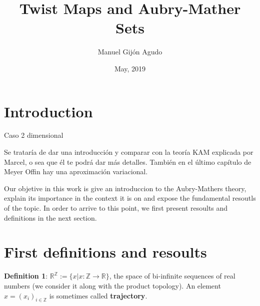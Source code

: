\documentclass{article}
\title{Twist Maps and Aubry-Mather Sets}
\author{Manuel Gijón Agudo }
\date{May, 2019}
\begin{document}
	\begin{titlepage}
		\maketitle{} 
	\end{titlepage}
	
	\newpage
	\tableofcontents
	\newpage
	

\section{Introduction}

	
	
	Caso 2 dimensional
	
	Se trataría de dar una introducción y comparar con la teoría KAM explicada por Marcel, o sea que él te podrá dar más detalles.
También en el último capítulo de Meyer Offin hay una aproximación variacional. 


		
	Our objetive in this work is give an introduccion to the Aubry-Mathers theory, explain its importance in the context it is on and expose the fundamental resoutls of the topic. In order to arrive to this point, we first present resoults and definitions in the next section.
		
		
		
	

	
		
	


\section{First definitions and resoults}
		
\noindent \textbf{Definition 1}: $\mathbb{R}^{\mathbb{Z}} := \{ x | x: \mathbb{Z} \rightarrow \mathbb{R}  \}$, the space of bi-infinite sequences of real numbers (we consider it along with the product topology). An element $x = (x_{i})_{i \in \mathbb{Z}}$ is sometimes called \textbf{trajectory}.
\end{document}
